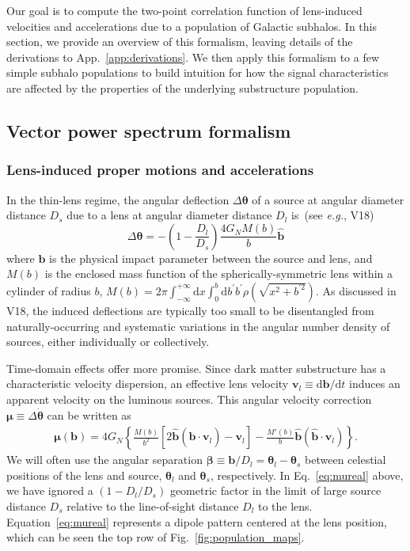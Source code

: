 \documentclass[twocolumn]{aastex63}
\newcommand{\vect}[1]{\boldsymbol{\mathbf{#1}}}
\newcommand{\dd}{\mathrm{d}}
\begin{document}
Our goal is to compute the two-point correlation function of lens-induced velocities and accelerations due to a population of Galactic subhalos. In this section, we provide an overview of this formalism, leaving details of the derivations to App.~\ref{app:derivations}. We then apply this formalism to a few simple subhalo populations to build intuition for how the signal characteristics are affected by the properties of the underlying substructure population.

\subsection{Vector power spectrum formalism}
\label{sec:formalism}

\subsubsection*{Lens-induced proper motions and accelerations}

In the thin-lens regime, the angular deflection $\Delta \boldsymbol{\theta}$ of a source at angular diameter distance $D_s$ due to a lens at angular diameter distance $D_l$ is~(see \emph{e.g.}, V18)
\begin{equation}
\Delta \boldsymbol{\theta}=-\left(1-\frac{D_{l}}{D_{s}}\right) \frac{4 G_{N} M(b)}{b} \hat{\mathbf{b}}
\end{equation}
where $\vect{b}$ is the physical impact parameter between the source and lens, and $M(b)$ is the enclosed mass function of the spherically-symmetric lens within a cylinder of radius $b$, $M\left(b\right)=2 \pi \int_{-\infty}^{+\infty} \mathrm{d} x \int_{0}^{b} \mathrm{d} b^{\prime} b^{\prime} \rho\left(\sqrt{x^{2}+b^{\prime 2}}\right)$. As discussed in V18, the induced deflections are typically too small to be disentangled from naturally-occurring and systematic variations in the angular number density of sources, either individually or collectively.

Time-domain effects offer more promise. Since dark matter substructure has a characteristic velocity dispersion, an effective lens velocity $\vect{v}_l \equiv {\dd \vect{b}}/{\dd t}$ induces an apparent velocity on the luminous sources. This angular velocity correction $\vect{\mu}\equiv\Delta\boldsymbol{\dot \theta}$ can be written as 
\begin{align}
\vect{\mu}(\vect{b}) = 4 G_N \left\lbrace \frac{M(b)}{b^2} \left[ 2 \hat{\vect{b}} (\hat{\vect{b}} \cdot \vect{v}_l) -  \vect{v}_l \right] -\frac{M'(b)}{b} \hat{\vect{b}} (\hat{\vect{b}} \cdot \vect{v}_l) \right\rbrace.
\label{eq:mureal}
\end{align}
We will often use the angular separation $\vect{\beta} \equiv \vect{b}/D_l = \vect{\theta}_l -  \vect{\theta}_s$  between celestial positions of the lens and source, $\vect{\theta}_l$ and $\vect{\theta}_s$, respectively. 
In Eq.~\ref{eq:mureal} above, we have ignored a $(1-{D_l}/{D_s})$ geometric factor in the limit of large source distance $D_s$ relative to the line-of-sight distance $D_l$ to the lens. Equation~\ref{eq:mureal} represents a dipole pattern centered at the lens position, which can be seen the top row of Fig.~\ref{fig:population_maps}.
\end{document}
